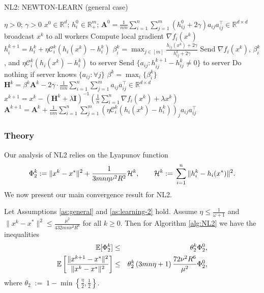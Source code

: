 \documentclass[12pt]{article}
\newcommand{\squeeze}{}
\newcommand{\eqdef}{\; { := }\;}
\newcommand{\R}{\mathbb{R}}
\newcommand{\newalpha}{h}
\newcommand{\mA}{\mathbf{A}}
\newcommand{\mH}{\mathbf{H}}
\newcommand{\mI}{\mathbf{I}}
\newcommand{\cC}{{\mathcal{C}}}
\begin{document}
\begin{algorithm}[tb]
	\caption{{\sf NL2: NEWTON-LEARN} (general case)}
	\label{alg:NL2}
\begin{algorithmic}
		 $\eta>0$; $\gamma>0$ 
		$x^0 \in \R^d$; $h^0_i \in \R^{m}_{+}$; $\mA^0 = \frac{1}{nm} \sum \limits_{i=1}^n \sum\limits_{j=1}^{m} (h_{ij}^0 + 2\gamma)a_{ij}a_{ij}^\top \in \R^{d\times d}$
		\STATE broadcast $x^k$ to all workers 
		\STATE  Compute local gradient $\nabla f_i(x^k)$ 
		\STATE $h^{k+1}_i = h^k_i + \eta \cC_i^k(\newalpha_i(x^k) - h^k_i)$ 
		\STATE $\beta_i^k = \max_{j\in [m]} \frac{\newalpha_{ij}(x^k) + 2\gamma}{h_{ij}^k + 2\gamma}$
		\STATE Send $\nabla f_i(x^k)$, $\beta_i^k$, and $\eta \cC_i^k(\newalpha_i(x^k) - h^k_i)$ to server 
		 Send $\{a_{ij} : h_{ij}^{k+1} - h_{ij}^k \neq 0\}$ to server
		 Do nothing if server knows $\{a_{ij} : \forall j\}$
		\ENDFOR
		\STATE $\beta^k = \max_{i} \{  \beta_i^k  \}$
		\STATE $\mH^k = \beta^k \mA^k - 2\gamma \cdot\frac{1}{nm} \sum \limits_{i=1}^n  \sum \limits_{j=1}^{m}a_{ij}a_{ij}^\top \in \R^{d\times d}$
		\STATE $x^{k+1} = x^k - \left( \mH^k + \lambda \mI \right)^{-1} \left(  \frac{1}{n} \sum \limits_{i=1}^n \nabla f_i(x^k) + \lambda x^k  \right)$
		\STATE $\mA^{k+1} = \mA^k + \frac{1}{nm} \sum \limits_{i=1}^n  \sum \limits_{j=1}^{m} (\eta \cC_i^k(\newalpha_i(x^k) - h^k_i))_j a_{ij}a_{ij}^\top $
		\ENDFOR
	\end{algorithmic}
\end{algorithm} 

\subsubsection{Theory}

Our analysis of {\sf NL2} relies on the  Lyapunov function 
$$\squeeze
\Phi_2^k \eqdef \|x^{k} - x^*\|^2 + \frac{1}{3mn\eta  \nu^2 R^2} {\cal H}^{k}, \qquad {\cal H}^k \eqdef  \sum_{i=1}^n \|h_i^k - \newalpha_i(x^*)\|^2.
$$
We now present our main convergence result for {\sf NL2}. 

\begin{theorem}[Convergence of {\sf NL2}]\label{th:general}
	Let Assumptions \ref{as:general} and \ref{as:learning-2} hold. Assume $\eta\leq \frac{1}{\omega+1}$ and $\|x^k - x^*\|^2 \leq \frac{\mu^2}{432mn \nu^2R^6}$ for all $k\geq 0$. Then for Algorithm \ref{alg:NL2} we have the inequalities 
\begin{eqnarray*}
\squeeze
	\mathbb{E}[\Phi_2^k] &\leq &  \theta_2^k \Phi_2^0 ,\notag\\ 
	\squeeze  \mathbb{E} \left[  \frac{\|x^{k+1} - x^*\|^2}{\|x^k - x^*\|^2 }  \right] 
		 &\leq & \theta_2^k  \left(  {3mn\eta} + 1  \right) \frac{72\nu^2 R^6}{\mu^2} \Phi_2^0, 
\end{eqnarray*}
where $\theta_2 \eqdef  1 - \min \left\{  \frac{\eta}{2}, \frac{1}{2}  \right\}  $.
\end{theorem}
\end{document}
